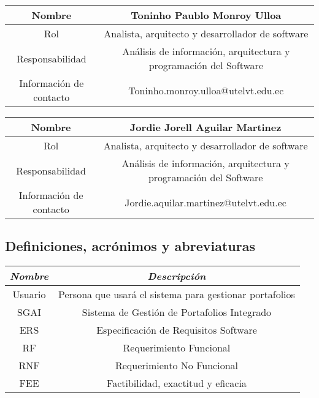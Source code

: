 \documentclass[11pt]{article}
\begin{document}
\begin{tabular}{|c|c|}

\hline
Nombre & Toninho Paublo Monroy Ulloa  \\
\hline
Rol & Analista, arquitecto y desarrollador de software \\
\hline
Responsabilidad & Análisis de información, arquitectura y programación del Software  \\
\hline
Información de contacto & Toninho.monroy.ulloa@utelvt.edu.ec \\
\hline

\end{tabular}
\vspace{10pt}

\begin{tabular}{|c|c|}

\hline
Nombre & Jordie Jorell Aguilar Martinez \\
\hline
Rol & Analista, arquitecto y desarrollador de software \\
\hline
Responsabilidad & Análisis de información, arquitectura y programación del Software  \\
\hline
Información de contacto & Jordie.aquilar.martinez@utelvt.edu.ec \\
\hline

\end{tabular}
\vspace{10pt}

\subsection{\textbf{Definiciones, acrónimos y abreviaturas}}

\vspace{10pt}

\begin{tabular}{|c|c|}

\hline
\textit{Nombre} & \textit{Descripción}  \\
\hline
Usuario & Persona que usará el sistema para gestionar portafolios \\
\hline
SGAI & Sistema de Gestión de Portafolios Integrado \\
\hline
ERS & Especificación de Requisitos Software \\
\hline
RF & Requerimiento Funcional \\
\hline
RNF & Requerimiento No Funcional\\
\hline
FEE & Factibilidad, exactitud y eficacia \\
\hline

\end{tabular}
\end{document}
